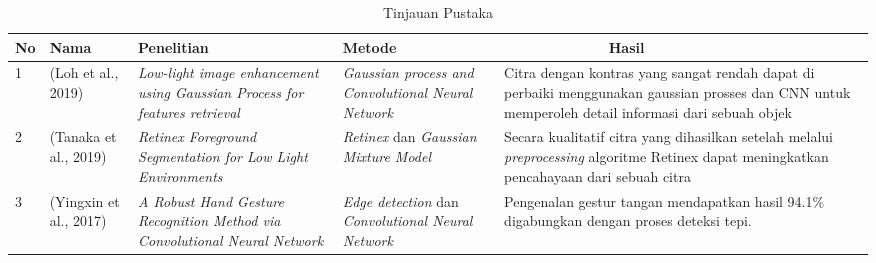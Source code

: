 \begin{table}[htbp]
	\caption{Tinjauan Pustaka}
	\label{labelku}
	\vspace{0.2cm}
	
	\begin{tabular}{|p{0.5cm}|p{2cm}|p{3cm}|p{3cm}|p{4cm}|}
		\hline
		No \centering & Nama \centering &\centering  Penelitian & \centering Metode & \ \ \ \ \ \ \ \ \  \ \ \ \ Hasil \\
		
		\hline
		1 & (Loh et al., 2019) & \emph{Low-light image enhancement using Gaussian Process for features retrieval} & \emph{Gaussian process and Convolutional Neural Network} & Citra dengan kontras yang sangat rendah dapat di perbaiki menggunakan gaussian prosses dan CNN untuk memperoleh detail informasi dari sebuah objek \\
		
		\hline
		2 & (Tanaka et al., 2019) & \emph{Retinex Foreground Segmentation for Low Light Environments} & \emph{Retinex} dan \emph{Gaussian Mixture Model} & Secara kualitatif citra yang dihasilkan setelah melalui \emph{preprocessing} algoritme Retinex dapat meningkatkan pencahayaan dari sebuah citra\\
		
		\hline
		3 & (Yingxin et al., 2017) & \emph{A Robust Hand Gesture Recognition Method via Convolutional Neural Network} & \emph{Edge detection} dan \emph{Convolutional Neural Network} & Pengenalan gestur tangan mendapatkan hasil 94.1\% digabungkan dengan proses deteksi tepi.\\
		\hline
	\end{tabular}
\end{table}

